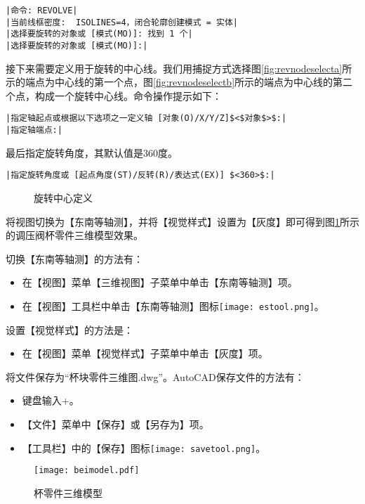\begin{procedure}
\begin{lstlisting}
|命令: REVOLVE|
|当前线框密度:  ISOLINES=4，闭合轮廓创建模式 = 实体|
|选择要旋转的对象或 [模式(MO)]: 找到 1 个|
|选择要旋转的对象或 [模式(MO)]:|
\end{lstlisting}
接下来需要定义用于旋转的中心线。我们用捕捉方式选择图\ref{fig:revnodeselecta}所示的端点为中心线的第一个点，图\ref{fig:revnodeselectb}所示的端点为中心线的第二个点，构成一个旋转中心线。命令操作提示如下：
\begin{lstlisting}
|指定轴起点或根据以下选项之一定义轴 [对象(O)/X/Y/Z]$<$对象$>$:|
|指定轴端点:|
\end{lstlisting}
最后指定旋转角度，其默认值是360度。
\begin{lstlisting}
|指定旋转角度或 [起点角度(ST)/反转(R)/表达式(EX)] $<360>$:|
\end{lstlisting}

\begin{figure}[htbp]
\centering
{}\hspace{30pt}
\caption{旋转中心定义}
\end{figure}
\item 将视图切换为【东南等轴测】，并将【视觉样式】设置为【灰度】即可得到图\ref{fig:beimodel}所示的调压阀杯零件三维模型效果。

切换【东南等轴测】的方法有：
\begin{itemize}
\item 在【视图】菜单【三维视图】子菜单中单击【东南等轴测】项。
\item 在【视图】工具栏中单击【东南等轴测】图标\texttt{[image: estool.png]}。
\end{itemize}
设置【视觉样式】的方法是：
\begin{itemize}
\item 在【视图】菜单【视觉样式】子菜单中单击【灰度】项。
\end{itemize}
\item 将文件保存为“杯块零件三维图.dwg”。AutoCAD保存文件的方法有：
\begin{itemize}
\item 键盘输入+。
\item 【文件】菜单中【保存】或【另存为】项。
\item 【工具栏】中的【保存】图标\texttt{[image: savetool.png]}。
\end{itemize}
\end{procedure}
\begin{figure}
\centering
\texttt{[image: beimodel.pdf]}
\caption{杯零件三维模型}\label{fig:beimodel}
\end{figure}

